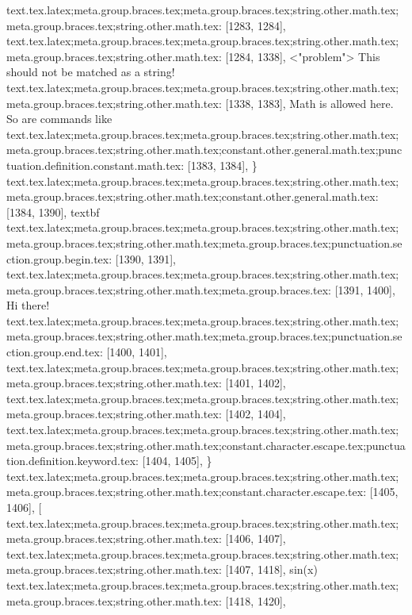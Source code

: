 {{{{{{{{{{{{{{{{{{{{{{{{{{{{{{{{{{text.tex.latex;meta.group.braces.tex;meta.group.braces.tex;string.other.math.tex;meta.group.braces.tex;string.other.math.tex: [1283, 1284], {
}
text.tex.latex;meta.group.braces.tex;meta.group.braces.tex;string.other.math.tex;meta.group.braces.tex;string.other.math.tex: [1284, 1338], {  <"problem"> This should not be matched as a string!
}
text.tex.latex;meta.group.braces.tex;meta.group.braces.tex;string.other.math.tex;meta.group.braces.tex;string.other.math.tex: [1338, 1383], {  Math is allowed here. So are commands like }
text.tex.latex;meta.group.braces.tex;meta.group.braces.tex;string.other.math.tex;meta.group.braces.tex;string.other.math.tex;constant.other.general.math.tex;punctuation.definition.constant.math.tex: [1383, 1384], {\}
text.tex.latex;meta.group.braces.tex;meta.group.braces.tex;string.other.math.tex;meta.group.braces.tex;string.other.math.tex;constant.other.general.math.tex: [1384, 1390], {textbf}
text.tex.latex;meta.group.braces.tex;meta.group.braces.tex;string.other.math.tex;meta.group.braces.tex;string.other.math.tex;meta.group.braces.tex;punctuation.section.group.begin.tex: [1390, 1391], {{}
text.tex.latex;meta.group.braces.tex;meta.group.braces.tex;string.other.math.tex;meta.group.braces.tex;string.other.math.tex;meta.group.braces.tex: [1391, 1400], {Hi there!}
text.tex.latex;meta.group.braces.tex;meta.group.braces.tex;string.other.math.tex;meta.group.braces.tex;string.other.math.tex;meta.group.braces.tex;punctuation.section.group.end.tex: [1400, 1401], {}}
text.tex.latex;meta.group.braces.tex;meta.group.braces.tex;string.other.math.tex;meta.group.braces.tex;string.other.math.tex: [1401, 1402], {
}
text.tex.latex;meta.group.braces.tex;meta.group.braces.tex;string.other.math.tex;meta.group.braces.tex;string.other.math.tex: [1402, 1404], {  }
text.tex.latex;meta.group.braces.tex;meta.group.braces.tex;string.other.math.tex;meta.group.braces.tex;string.other.math.tex;constant.character.escape.tex;punctuation.definition.keyword.tex: [1404, 1405], {\}
text.tex.latex;meta.group.braces.tex;meta.group.braces.tex;string.other.math.tex;meta.group.braces.tex;string.other.math.tex;constant.character.escape.tex: [1405, 1406], {[}
text.tex.latex;meta.group.braces.tex;meta.group.braces.tex;string.other.math.tex;meta.group.braces.tex;string.other.math.tex: [1406, 1407], {
}
text.tex.latex;meta.group.braces.tex;meta.group.braces.tex;string.other.math.tex;meta.group.braces.tex;string.other.math.tex: [1407, 1418], {    sin(x)
}
text.tex.latex;meta.group.braces.tex;meta.group.braces.tex;string.other.math.tex;meta.group.braces.tex;string.other.math.tex: [1418, 1420], {  }
}}}}}}}}}}}}}}}}}}}}}}}}}}}}}}}}}}}}
